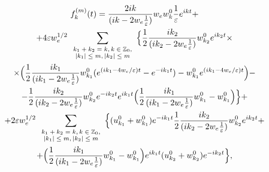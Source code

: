 \begin{multline*}

f^{(m)}_k(t)= \frac{2ik}{(ik-2w_e\frac1\varepsilon)}w_e w^0_k\frac1\varepsilon e^{ikt}+

\\

+4\varepsilon w_e^{1/2} 

\sum_{ \scriptsize

\begin{array}{c}k_1+k_2=k, k\in \mathbb Z_0, \\ |k_1|\le m,|k_2|\le m

\end{array}

}

\Bigl\{

\frac12\frac{ik_2}{(ik_2-2w_e\frac1\varepsilon)}w^0_{k_2}e^{ik_2 t}

\times 

\\

\times

\Bigl(\frac12\frac{ik_1}{(ik_1-2w_e\frac1\varepsilon)}w^0_{k_1}(e^{(ik_1-4w_e /\varepsilon)t}-e^{-ik_1t})-w^0_{k_1} e^{(ik_1-4w_e /\varepsilon)t}\Bigr)-

\\

-\frac12\frac{ik_2}{(ik_2-2w_e\frac1\varepsilon)}w^0_{k_2}e^{-ik_2t} e^{ik_1t}\Bigl(\frac12\frac{ik_1}{(ik_1-2w_e\frac1\varepsilon)}w^0_{k_1}-w^0_{k_1} \Bigr)\Bigr\}+

\\

+ 2\varepsilon w_e^{1/2} 

\sum_{\scriptsize \begin{array}{c} k_1+k_2=k,k\in \mathbb Z_0, \\ |k_1|\le m, |k_2|\le m 

\end{array}

}\Bigl\{(u_{k_1}^0+w^0_{k_1})e^{-ik_1t} \frac12\frac{ik_2}{(ik_2-2w_e\frac1\varepsilon)}w^0_{k_2} e^{ik_2t} 

+

\\

+\Bigl(\frac12\frac{ik_1}{(ik_1-2w_e\frac1\varepsilon)}w^0_{k_1}-w^0_{k_1}\Bigr)  e^{ik_1t}(u_{k_2}^0+w^0_{k_2})e^{-ik_2t}\Bigr\},

\end{multline*}

